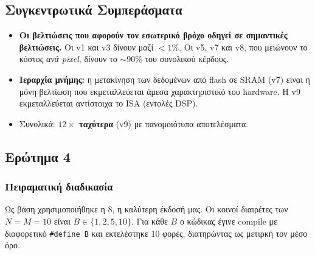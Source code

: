 \documentclass[11pt,a4paper]{article}
\newcommand{\code}[1]{\texttt{#1}}
\newcommand{\en}[1]{\foreignlanguage{english}{#1}}
\begin{document}
\subsection{Συγκεντρωτικά Συμπεράσματα}
\begin{itemize}[leftmargin=*]
  \item \textbf{Οι βελτιώσεις που αφορούν τον εσωτερικό βρόχο οδηγεί σε σημαντικές βελτιώσεις.} Οι v1 και v3
  δίνουν μαζί $<1\%$. Οι v5, v7 και v8, που μειώνουν το κόστος \emph{ανά pixel}, δίνουν το $\sim$90\%
  του συνολικού κέρδους.
  \item \textbf{Ιεραρχία μνήμης:} η μετακίνηση των δεδομένων από flash σε SRAM (v7) είναι η μόνη
  βελτίωση που εκμεταλλεύεται άμεσα χαρακτηριστικό του \en{hardware}. Η v9 εκμεταλλεύεται
  αντίστοιχα το \en{ISA} (εντολές DSP).
  \item Συνολικά: \textbf{$12\times$ ταχύτερα} (v9) με πανομοιότυπα αποτελέσματα.
\end{itemize}

\subsection{Ερώτημα 4}

\subsubsection*{Πειραματική διαδικασία}
Ως βάση χρησιμοποιήθηκε η 8, η καλύτερη έκδοσή μας. Οι
κοινοί διαιρέτες των $N=M=10$ είναι $B\in\{1,2,5,10\}$. Για κάθε $B$ ο κώδικας έγινε compile με
διαφορετικό \code{\#define B} και εκτελέστηκε 10 φορές, διατηρώντας ως μετιρκή τον μέσο όρο.
\end{document}
